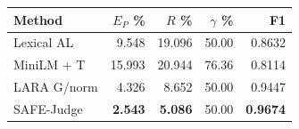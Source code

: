 \begin{tabular}{@{}lrrrr@{}}
\toprule
Method & $E_P$ \% & $R$ \% & $\gamma$ \% & F1 \\
\midrule
Lexical AL & 9.548 & 19.096 & 50.00 & 0.8632 \\
MiniLM + T & 15.993 & 20.944 & 76.36 & 0.8114 \\
LARA G/norm & 4.326 & 8.652 & 50.00 & 0.9447 \\
SAFE-Judge & \textbf{2.543} & \textbf{5.086} & 50.00 & \textbf{0.9674} \\
\bottomrule
\end{tabular}
